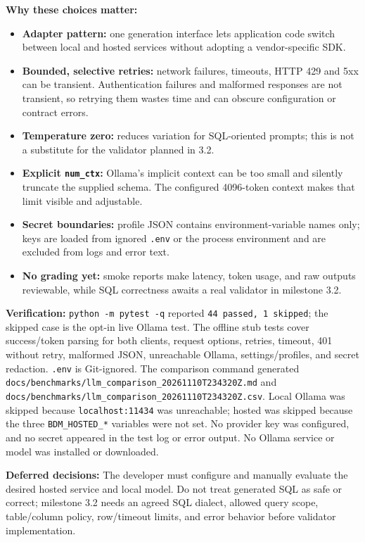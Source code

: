 \documentclass[11pt,a4paper]{article}
\begin{document}
\textbf{Why these choices matter:}
\begin{itemize}
  \item \textbf{Adapter pattern:} one generation interface lets application
        code switch between local and hosted services without adopting a
        vendor-specific SDK.
  \item \textbf{Bounded, selective retries:} network failures, timeouts, HTTP
        429 and 5xx can be transient. Authentication failures and malformed
        responses are not transient, so retrying them wastes time and can
        obscure configuration or contract errors.
  \item \textbf{Temperature zero:} reduces variation for SQL-oriented prompts;
        this is not a substitute for the validator planned in 3.2.
  \item \textbf{Explicit \texttt{num\_ctx}:} Ollama's implicit context can be
        too small and silently truncate the supplied schema. The configured
        4096-token context makes that limit visible and adjustable.
  \item \textbf{Secret boundaries:} profile JSON contains environment-variable
        names only; keys are loaded from ignored \texttt{.env} or the process
        environment and are excluded from logs and error text.
  \item \textbf{No grading yet:} smoke reports make latency, token usage, and
        raw outputs reviewable, while SQL correctness awaits a real validator
        in milestone 3.2.
\end{itemize}

\textbf{Verification:} \texttt{python -m pytest -q} reported
\texttt{44 passed, 1 skipped}; the skipped case is the opt-in live Ollama test.
The offline stub tests cover success/token parsing for both clients, request
options, retries, timeout, 401 without retry, malformed JSON, unreachable
Ollama, settings/profiles, and secret redaction. \texttt{.env} is Git-ignored.
The comparison command generated
\texttt{docs/benchmarks/llm\_comparison\_20261110T234320Z.md} and
\texttt{docs/benchmarks/llm\_comparison\_20261110T234320Z.csv}. Local Ollama was
skipped because \texttt{localhost:11434} was unreachable; hosted was skipped
because the three \texttt{BDM\_HOSTED\_*} variables were not set. No provider
key was configured, and no secret appeared in the test log or error output.
No Ollama service or model was installed or downloaded.

\textbf{Deferred decisions:} The developer must configure and manually evaluate
the desired hosted service and local model. Do not treat generated SQL as safe
or correct; milestone 3.2 needs an agreed SQL dialect, allowed query scope,
table/column policy, row/timeout limits, and error behavior before validator
implementation.
\end{document}
